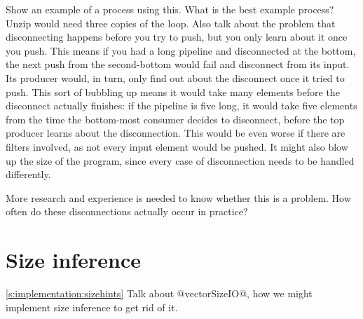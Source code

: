 Show an example of a process using this. What is the best example process? Unzip would need three copies of the loop.
Also talk about the problem that disconnecting happens before you try to push, but you only learn about it once you push.
This means if you had a long pipeline and disconnected at the bottom, the next push from the second-bottom would fail and disconnect from its input.
Its producer would, in turn, only find out about the disconnect once it tried to push.
This sort of bubbling up means it would take many elements before the disconnect actually finishes: if the pipeline is five long, it would take five elements from the time the bottom-most consumer decides to disconnect, before the top producer learns about the disconnection.
This would be even worse if there are filters involved, as not every input element would be pushed.
It might also blow up the size of the program, since every case of disconnection needs to be handled differently.

More research and experience is needed to know whether this is a problem.
How often do these disconnections actually occur in practice?

\section{Size inference}
\label{s:Future:SizeInference}
\cref{s:implementation:sizehints}
Talk about @vectorSizeIO@, how we might implement size inference to get rid of it.

